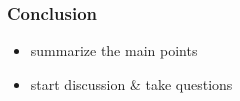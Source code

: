 \begin{frame}
	\frametitle{Conclusion}

	\begin{itemize}
		\item summarize the main points
		\item start discussion \& take questions
	\end{itemize}
\end{frame}